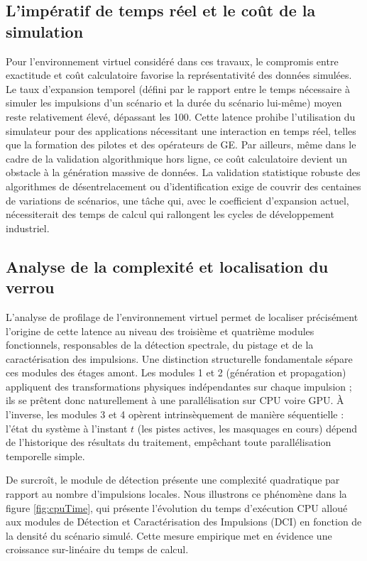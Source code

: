 \subsection{L'impératif de temps réel et le coût de la simulation}
Pour l'environnement virtuel considéré dans ces travaux, le compromis entre exactitude et coût calculatoire favorise la représentativité des données simulées. Le taux d'expansion temporel (défini par le rapport entre le temps nécessaire à simuler les impulsions d'un scénario et la durée du scénario lui-même) moyen reste relativement élevé, dépassant les 100. Cette latence prohibe l'utilisation du simulateur pour des applications nécessitant une interaction en temps réel, telles que la formation des pilotes et des opérateurs de GE. Par ailleurs, même dans le cadre de la validation algorithmique hors ligne, ce coût calculatoire devient un obstacle à la génération massive de données. La validation statistique robuste des algorithmes de désentrelacement ou d'identification exige de couvrir des centaines de variations de scénarios, une tâche qui, avec le coefficient d'expansion actuel, nécessiterait des temps de calcul qui rallongent les cycles de développement industriel.

\subsection{Analyse de la complexité et localisation du verrou}
L'analyse de profilage de l'environnement virtuel permet de localiser précisément l'origine de cette latence au niveau des troisième et quatrième modules fonctionnels, responsables de la détection spectrale, du pistage et de la caractérisation des impulsions. Une distinction structurelle fondamentale sépare ces modules des étages amont. Les modules 1 et 2 (génération et propagation) appliquent des transformations physiques indépendantes sur chaque impulsion ; ils se prêtent donc naturellement à une parallélisation sur CPU voire GPU. À l'inverse, les modules 3 et 4 opèrent intrinsèquement de manière séquentielle : l'état du système à l'instant $t$ (les pistes actives, les masquages en cours) dépend de l'historique des résultats du traitement, empêchant toute parallélisation temporelle simple.

De surcroît, le module de détection présente une complexité quadratique par rapport au nombre d'impulsions locales. Nous illustrons ce phénomène dans la figure \ref{fig:cpuTime}, qui présente l'évolution du temps d'exécution CPU alloué aux modules de Détection et Caractérisation des Impulsions (DCI) en fonction de la densité du scénario simulé. Cette mesure empirique met en évidence une croissance sur-linéaire du temps de calcul.

